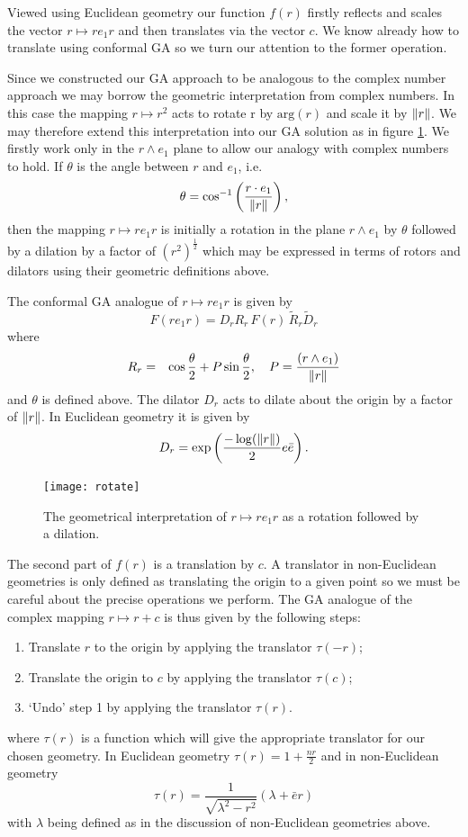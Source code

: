 Viewed using Euclidean geometry our function $f(r)$ firstly reflects and
scales the vector $r \mapsto re_1r$ and then translates via the vector $c$. We
know already how to translate using conformal GA so we turn our attention to
the former operation.

Since we constructed our GA approach to be analogous to the complex number approach we
may borrow the geometric interpretation from complex numbers. In this case the mapping 
$r \mapsto r^2$ acts to rotate r by $\mathrm{arg}(r)$ and scale it by
$\left\Vert r \right\Vert$. We may therefore extend this interpretation into our GA solution as in
figure \ref{fig:rotate}. We firstly work only in the $r \wedge e_1$ plane to allow
our analogy with complex numbers to hold. If $\theta$ is the angle between $r$ and
$e_1$, i.e.
\[
\theta = \cos^{-1}\left(\frac{r \cdot e_1}{\left\Vert r \right\Vert}\right),
\] 
then the mapping $r \mapsto re_1r$ is initially a rotation in the plane $r \wedge e_1$
by $\theta$ followed by a dilation by a factor of $(r^2)^\frac{1}{2}$ 
which may be expressed in terms of rotors and dilators using their geometric
definitions above.

\begin{definition}
The conformal GA analogue of $r \mapsto re_1r$ is given by
\[
F(re_1r) = D_r R_r\,F(r)\,\tilde{R}_r \tilde{D}_r
\]
where
\begin{eqnarray*}
R_r & = & \cos \frac{\theta}{2} + P \sin \frac{\theta}{2},
    \quad
P = \frac{(r \wedge e_1)}{\left\Vert r \right\Vert}
\end{eqnarray*}
and $\theta$ is defined above.
The dilator $D_r$ acts to dilate about the origin by a factor of
$\left\Vert r \right\Vert$. In Euclidean geometry it is given by
\[
D_r = \exp\left( \frac{-\log(\left\Vert r \right\Vert)}{2} e\bar{e} \right).
\]
\end{definition}

\begin{figure}
\centering
\texttt{[image: rotate]}
\caption{\label{fig:rotate}%
  The geometrical interpretation of $r \mapsto re_1r$ as a rotation followed by a dilation.
}
\end{figure}

The second part of $f(r)$ is a translation by $c$. A translator in non-Euclidean
geometries is only defined as translating the origin to a given point so we must be
careful about the precise operations we perform. The GA analogue of the
complex mapping $r \mapsto r + c$ is thus given by the following steps:
\begin{enumerate}
\item Translate $r$ to the origin by applying the translator $\tau(-r)$;
\item Translate the origin to $c$ by applying the translator $\tau(c)$;
\item `Undo' step 1 by applying the translator $\tau(r)$.
\end{enumerate}
where $\tau(r)$ is a function which will give the appropriate translator for our 
chosen geometry. In Euclidean geometry $\tau(r) = 1 + \frac{nr}{2}$ and in
non-Euclidean geometry
\[
\tau(r) = \frac{1}{\sqrt{\lambda^2 - r^2}}(\lambda + \bar{e}r)
\]
with $\lambda$ being defined as in the discussion of non-Euclidean geometries above.

